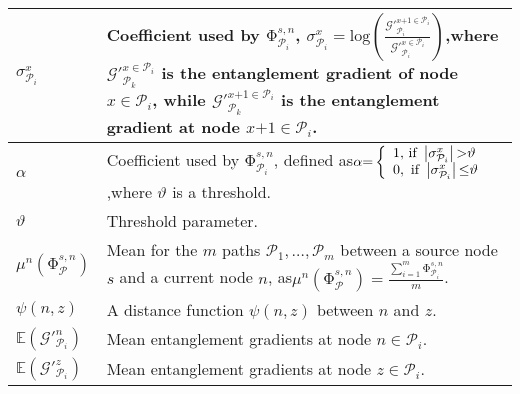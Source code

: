 \documentclass[11pt]{article}%
\begin{document}
\begin{longtable}{|p{1.6in}|p{2.8in}|}
${\sigma }^x_{{\mathcal{P}}_i}$ & Coefficient used by ${\mathrm{\Phi }}^{s,n}_{{\mathcal{P}}_i}$, \newline ${\sigma }^x_{{\mathcal{P}}_i}\mathrm{=log}\left(\frac{{\mathcal{G}}'^{x\mathrm{+1}\mathrm{\in }{\mathcal{P}}_i}_{{\mathcal{P}}_i}}{{\mathcal{G}}'^{x\mathrm{\in }{\mathcal{P}}_i}_{{\mathcal{P}}_i}}\right)$,\newline where ${\mathcal{G}}'^{x\mathrm{\in }{\mathcal{P}}_i}_{{\mathcal{P}}_k}$ is the entanglement gradient of node $x\mathrm{\in }{\mathcal{P}}_i$, while ${\mathcal{G}}'^{x\mathrm{+1}\mathrm{\in }{\mathcal{P}}_i}_{{\mathcal{P}}_k}$ is the entanglement gradient at node $x\mathrm{+1}\mathrm{\in }{\mathcal{P}}_i$. \\ \hline 
$\alpha $ & Coefficient used by ${\mathrm{\Phi }}^{s,n}_{{\mathcal{P}}_i}$, defined as\newline $\alpha \mathrm{=}\left\{ \begin{array}{l}
\mathrm{1,}\textnormal{ if }\left|{\sigma }^x_{{\mathcal{P}}_i}\right|\mathrm{>}\vartheta  \\ 
0,\textnormal{ if }\left|{\sigma }^x_{{\mathcal{P}}_i}\right|\mathrm{\le }\vartheta  \end{array}
\right.$,\newline where $\vartheta $ is a threshold. \\ \hline 
$\vartheta $ & Threshold parameter. \\ \hline 
${\mu }^n\left({\mathrm{\Phi }}^{s,n}_{\mathcal{P}}\right)$ & Mean for the $m$ paths ${\mathcal{P}}_{\mathrm{1}}\mathrm{,\dots ,}{\mathcal{P}}_m$ between a source node $s$ and a current node $n$, as\newline ${\mu }^n\left({\mathrm{\Phi }}^{s,n}_{\mathcal{P}}\right)\mathrm{=}\frac{\sum^m_{i\mathrm{=1}}{{\mathrm{\Phi }}^{s,n}_{{\mathcal{P}}_i}}}{m}$. \\ \hline 
$\psi \left(n,z\right)$ & A distance function $\psi \left(n,z\right)$ between $n$ and $z$. \\ \hline 
$\mathbb{E}\left({\mathcal{G}}'^n_{{\mathcal{P}}_i}\right)$ & Mean entanglement gradients at node $n\mathrm{\in }{\mathcal{P}}_i$. \\ \hline 
$\mathbb{E}\left({\mathcal{G}}'^z_{{\mathcal{P}}_i}\right)$ & Mean entanglement gradients at node $z\mathrm{\in }{\mathcal{P}}_i$. \\ \hline 

\end{longtable}
\end{document}
